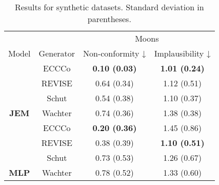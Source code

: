 \begin{table}

\caption{Results for synthetic datasets. Standard deviation in parentheses. \label{tab:results-synth}}
\centering
\begin{tabular}[t]{>{}cccc}
\toprule
\multicolumn{2}{c}{ } & \multicolumn{2}{c}{Moons} \\
\cmidrule(l{3pt}r{3pt}){3-4}
Model & Generator & Non-conformity ↓ & Implausibility ↓\\
\midrule
 & ECCCo & \textbf{0.10 (0.03)} & \textbf{1.01 (0.24)}\\

 & REVISE & 0.64 (0.34) & 1.12 (0.51)\\

 & Schut & 0.54 (0.38) & 1.10 (0.37)\\

\multirow{-4}{*}{\centering\arraybackslash \textbf{JEM}} & Wachter & 0.74 (0.36) & 1.38 (0.38)\\
\cmidrule{1-4}
 & ECCCo & \textbf{0.20 (0.36)} & 1.45 (0.86)\\

 & REVISE & 0.38 (0.39) & \textbf{1.10 (0.51)}\\

 & Schut & 0.73 (0.53) & 1.26 (0.67)\\

\multirow{-4}{*}{\centering\arraybackslash \textbf{MLP}} & Wachter & 0.78 (0.52) & 1.33 (0.60)\\
\bottomrule
\end{tabular}
\end{table}
